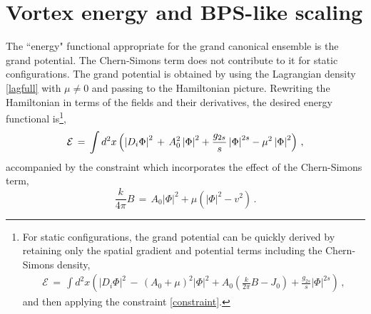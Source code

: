 \documentclass[12pt,a4paper]{article}
\def\be{\begin{equation}}
\def\ee{\end{equation}}
\newcommand{\bea}{\begin{eqnarray}}
\newcommand{\eea}{\end{eqnarray}}
\begin{document}
\section{Vortex energy and BPS-like scaling}
The ``energy" functional appropriate for the grand canonical ensemble is the grand potential. The Chern-Simons term does not contribute to it for static configurations. The grand potential is obtained by using the Lagrangian density \eqref{lagfull} with $\mu\neq 0$ and passing to the Hamiltonian picture. Rewriting the Hamiltonian in terms of the fields and their derivatives, the desired energy functional is\footnote{For static configurations, the grand potential can be quickly derived by retaining only the spatial gradient and potential terms including the Chern-Simons density,
 \bea
\mathcal{E} \,=\,\int d^2 x 
 \left( \left| D_i \Phi\right|^2 \,- \,\left(A_0+\mu\right)^2 \left| \Phi\right|^2  %
 + A_0\left(\frac{k}{2 \pi}  B -J_0\right)+ \frac{g_{2s}}{s}  \left| \Phi\right|^{2s}\right)\,,
 \eea
 and then applying the constraint \eqref{constraint}.
},
\bea
{\cal E}\,=\,\int d^2 x 
 \left( \left| D_i \Phi\right|^2 \,+ \,A_0^2 \left| \Phi\right|^2  %
 +\frac{g_{2s}}{s}  \left| \Phi\right|^{2s}-\mu^2\left| \Phi\right|^2\right)\,,
 \eea 
 accompanied by the constraint which incorporates the effect of the Chern-Simons term,
 \be
\frac{k}{4\pi} B\,=\,A_0|\Phi|^2+\mu\left(|\Phi|^2-v^2\right)\,.\label{constraint}
 \ee
 
\end{document}
